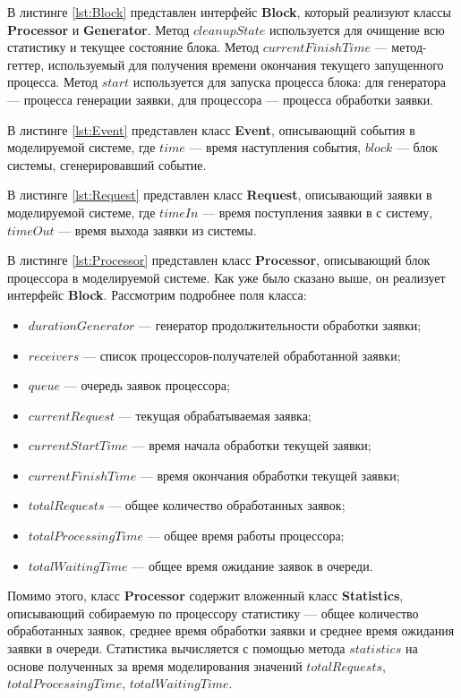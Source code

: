 В листинге \ref{lst:Block} представлен интерфейс \textbf{Block}, который реализуют классы \textbf{Processor} и \textbf{Generator}. Метод $cleanupState$ используется для очищение всю статистику и текущее состояние блока. Метод $currentFinishTime$ --- метод-геттер, используемый для получения времени окончания текущего запущенного процесса. Метод $start$ используется для запуска процесса блока: для генератора --- процесса генерации заявки, для процессора --- процесса обработки заявки.


В листинге \ref{lst:Event} представлен класс \textbf{Event}, описывающий события в моделируемой системе, где $time$ --- время наступления события, $block$ --- блок системы, сгенерировавший событие.


В листинге \ref{lst:Request} представлен класс \textbf{Request}, описывающий заявки в моделируемой системе, где $timeIn$ --- время поступления заявки в с систему, $timeOut$ --- время выхода заявки из системы.


В листинге \ref{lst:Processor} представлен класс \textbf{Processor}, описывающий блок процессора в моделируемой системе. Как уже было сказано выше, он реализует интерфейс \textbf{Block}. Рассмотрим подробнее поля класса:
\begin{itemize}
	\item $durationGenerator$ --- генератор продолжительности обработки заявки;
	\item $receivers$ --- список процессоров-получателей обработанной заявки;
	\item $queue$ --- очередь заявок процессора;
	\item $currentRequest$ --- текущая обрабатываемая заявка;
	\item $currentStartTime$ --- время начала обработки текущей заявки;
	\item $currentFinishTime$ --- время окончания обработки текущей заявки;
	\item $totalRequests$ --- общее количество обработанных заявок;
	\item $totalProcessingTime$ --- общее время работы процессора;
	\item $totalWaitingTime$ --- общее время ожидание заявок в очереди.
\end{itemize}
Помимо этого, класс \textbf{Processor} содержит вложенный класс \textbf{Statistics}, описывающий собираемую по процессору статистику --- общее количество обработанных заявок, среднее время обработки заявки и среднее время ожидания заявки в очереди. Статистика вычисляется с помощью метода $statistics$ на основе полученных за время моделирования значений $totalRequests$, $totalProcessingTime$, $totalWaitingTime$.


